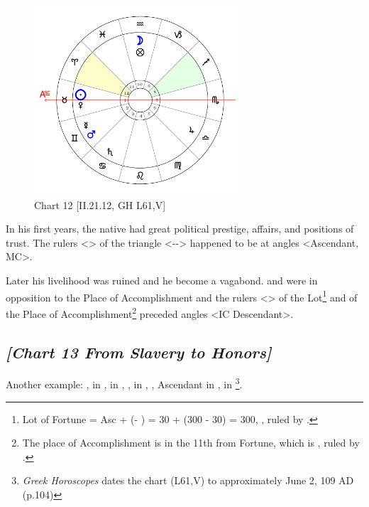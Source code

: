 \clearpage
\begin{figure}
\centering
\vspace{-20pt}
\includegraphics[width=0.68\textwidth]{charts/2_21_12}
\caption{Chart 12 [II.21.12, GH L61,V]}
\label{fig:chart12}
\end{figure}

In his first years, the native had great political prestige, affairs, and positions of trust. The rulers <\Venus\xspace \Moon> of the triangle <\Taurus-\Virgo-\Capricorn> happened to be at angles <Ascendant, MC>. 

Later his livelihood was ruined and he become a vagabond. \Mars\xspace and \Mercury\xspace were in opposition to the Place of Accomplishment and the rulers <\Saturn\xspace \Jupiter> of the Lot\footnote{Lot of Fortune = Asc + (\Moon\xspace\xspace - \Sun) = 30 + (300 - 30) = 300, \Aquarius, ruled by \Saturn.}
 and of the Place of Accomplishment\footnote{The place of Accomplishment is in the 11th from Fortune, which is \Sagittarius, ruled by \Jupiter.} preceded angles <IC Descendant>.
 
\newpage
\subsection*{\textit{[Chart 13 From Slavery to Honors]}}

Another example: \Sun, \Mercury\xspace in \Gemini,\Moon\xspace in \Capricorn, \Saturn, \Mars\xspace in \Aquarius, \Venus, Ascendant in \Cancer, \Jupiter\xspace in \Scorpio
\footnote{\textit{Greek Horoscopes} dates the chart (L61,V) to approximately June 2, 109 AD (p.104)}.

